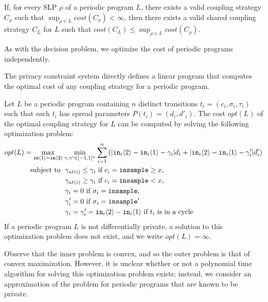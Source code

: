 \begin{prop}\label{ClassCouplingStrategiesAreEnoughProp}
    If, for every SLP $\rho$ of a periodic program $L$, there exists a valid coupling strategy $C_\rho$ such that $\sup_{\rho\in L}cost(C_\rho)< \infty$, then there exists a valid shared coupling strategy $C_L$ for $L$ such that $cost(C_L) \leq \sup_{\rho\in L}cost(C_\rho)$. 
\end{prop}

As with the decision problem, we optimize the cost of periodic programs independently.

The privacy constraint system directly defines a linear program that computes the optimal cost of any coupling strategy for a periodic program. 

\begin{prop}
    \label{prop:compute_opt_cost}
    Let $L$ be a periodic program containing $n$ distinct transitions $t_i = (c_i, \sigma_i, \tau_i)$ such that each $t_i$ has spread parameters $P(t_i) = (d_i, d'_i)$. The cost $opt(L)$ of the optimal coupling strategy for $L$ can be computed by solving the following optimization problem: 
    \begin{align*}
        opt(L) = \max_{\texttt{in}\langle1 \rangle\sim\texttt{in}\langle2 \rangle} &\min_{\gamma, \gamma' \in [-1, 1]^n} \sum_{i = 1}^n \left(|\texttt{in}_i\langle2 \rangle-\texttt{in}_i\langle1 \rangle - \gamma_i| d_i + |\texttt{in}_i\langle2 \rangle-\texttt{in}_i\langle1 \rangle - \gamma_i'|d_i' \right)\\ 
            \text{subject to }
            &\ \gamma_{at(i)} \leq \gamma_i \text{ if } c_i = \texttt{insample}\geq x, \\
            &\ \gamma_{at(i)} \geq \gamma_i \text{ if } c_i = \texttt{insample} < x, \\
            &\ \gamma_i = 0 \text{ if } \sigma_i = \texttt{insample}, \\
            &\ \gamma_i' = 0 \text{ if } \sigma_i = \texttt{insample}'\\
            &\ \gamma_i = \gamma_i'= \texttt{in}_i\langle2 \rangle-\texttt{in}_i\langle1 \rangle \text{ if } t_i \text{ is in a cycle}
    \end{align*}
    If a periodic program $L$ is not differentially private, a solution to this optimization problem does not exist, and we write $opt(L) = \infty$.
\end{prop}

Observe that the inner problem is convex, and so the outer problem is that of convex maximization. However, it is unclear whether or not a polynomial time algorithm for solving this optimization problem exists; instead, we consider an approximation of the problem for periodic programs that are known to be private. 

